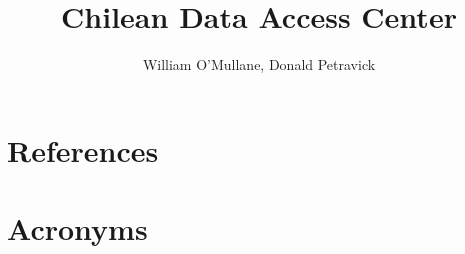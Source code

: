 \documentclass[DM]{lsstdoc}
\title[Chilean DAC ]{ Chilean Data Access Center }
\author   {William O'Mullane, Donald Petravick}
\begin{document}
%
%
\maketitle

\renewcommand{\thepage}{\arabic{page}}%

\setcounter{page}{1}%
%
%


\section{References\label{sect:references}}
\renewcommand{\refname}{}


\section{Acronyms}
\end{document}
